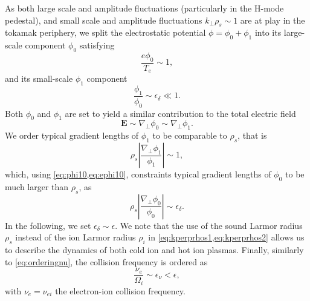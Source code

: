 As both large scale and amplitude fluctuations (particularly in the H-mode pedestal), and small scale and amplitude fluctuations $k_\perp \rho_s \sim 1$ are at play in the tokamak periphery, we split the electrostatic potential $\phi=\phi_0+\phi_1$ into its large-scale component $\phi_0$ satisfying
%
\begin{equation}
    \frac{e \phi_0}{T_e} \sim 1,
\end{equation}
%
and its small-scale $\phi_1$ component
%
\begin{equation}
    \frac{\phi_1}{\phi_0} \sim \epsilon_\delta \ll 1.
\label{eq:phi10}
\end{equation}
%
Both $\phi_0$ and $\phi_1$ are set to yield a similar contribution to the total electric field
%
\begin{equation}
    \mathbf E \sim \nabla_\perp \phi_0 \sim \nabla_\perp \phi_1.
\label{eq:ephi10}
\end{equation}
%
We order typical gradient lengths of $\phi_1$ to be comparable to $\rho_s$, that is
%
\begin{equation}
    \rho_s \left|\frac{\nabla_\perp \phi_1}{\phi_1}\right| \sim 1,
\label{eq:kperprhos1}
\end{equation}
%
which, using \cref{eq:phi10,eq:ephi10}, constraints typical gradient lengths of $\phi_0$ to be much larger than $\rho_s$, as
%
\begin{equation}
    \rho_s \left|\frac{\nabla_\perp \phi_0}{\phi_0}\right| \sim \epsilon_\delta.
\label{eq:kperprhos2}
\end{equation}
%
In the following, we set $\epsilon_\delta \sim \epsilon$.
%
We note that the use of the sound Larmor radius $\rho_s$ instead of the ion Larmor radius $\rho_i$ in \cref{eq:kperprhos1,eq:kperprhos2} allows us to describe the dynamics of both cold ion and hot ion plasmas.
%
Finally, similarly to \cref{eq:orderingnu}, the collision frequency is ordered as
%
\begin{equation}
    \frac{\nu_e}{\Omega_i}\sim \epsilon_\nu < \epsilon,
\label{eq:orderingcoll}
\end{equation}
%
with $\nu_e=\nu_{ei}$ the electron-ion collision frequency.


